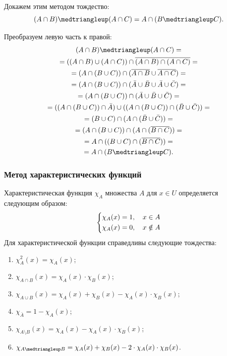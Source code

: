 \documentclass[a5paper, 11pt]{extarticle}
\theoremstyle{definition}
\theoremstyle{definition}
\theoremstyle{definition}
\numberwithin{figure}{section}
\numberwithin{table}{section}
\newcommand{\symdiff}{\medtriangleup}
\begin{document}
Докажем этим методом тождество:
\[
    (A \cap B) \symdiff (A \cap C) = A \cap (B \symdiff C).
\]

Преобразуем левую часть к правой:
\begin{gather*}
    (A \cap B) \symdiff (A \cap C) = \\ =
    ((A \cap B) \cup (A \cap C)) \cap \overline{(A \cap B) \cap (A \cap C)} = \\ =
    (A \cap (B \cup C)) \cap (\overline{A \cap B} \cup \overline{A \cap C}) = \\ =
    (A \cap (B \cup C)) \cap (\bar{A} \cup \bar{B} \cup \bar{A} \cup \bar{C}) = \\ =
    (A \cap (B \cup C)) \cap (\bar{A} \cup \bar{B} \cup \bar{C}) = \\ =
    ((A \cap (B \cup C)) \cap \bar{A}) \cup ((A \cap (B \cup C)) \cap (\bar{B} \cup \bar{C})) = \\ =
    (B \cup C) \cap (A \cap (\bar{B} \cup \bar{C})) = \\ =
    (A \cap (B \cup C)) \cap (A \cap (\overline{B \cap C})) = \\ =
    A \cap ((B \cup C) \cap (\overline{B \cap C})) = \\ =
    A \cap (B \symdiff C).
\end{gather*}

\subsubsection{Метод характеристических функций}

Характеристическая функция \(\chi_A\) множества \(A\) для \(x \in U\) определяется следующим образом:
\[
    \begin{dcases}
        \chi_A(x) = 1, \quad x \in A \\
        \chi_A(x) = 0, \quad x \notin A
    \end{dcases}
\]
Для характеристической функции справедливы следующие тождества:
\begin{enumerate}
    \item \(\chi_A^2(x) = \chi_A(x)\);
    \item \(\chi_{A \cap B}(x) = \chi_A(x) \cdot \chi_B(x)\);
    \item \(\chi_{A \cup B}(x) = \chi_A(x) + \chi_B(x) - \chi_A(x) \cdot \chi_B(x)\);
    \item \(\chi_{\bar{A}} = 1 - \chi_A(x)\);
    \item \(\chi_{A \setminus B}(x) = \chi_A(x) - \chi_A(x) \cdot \chi_B(x)\);
    \item \(\chi_{A \symdiff B} = \chi_A(x) + \chi_B(x) - 2 \cdot \chi_A(x) \cdot \chi_B(x)\).
\end{enumerate}
\end{document}
